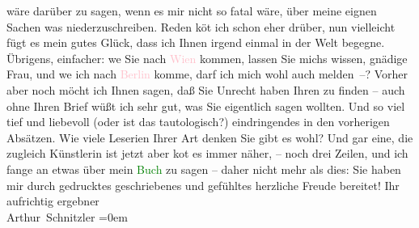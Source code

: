                wäre darüber zu sagen, wenn es mir nicht so fatal wäre, über meine eignen Sachen was
               niederzuschreiben. Reden kö{\geminationn}t ich schon eher drüber, nun
               vielleicht fügt es mein gutes Glück, dass {\pb}ich Ihnen irgend einmal in der Welt
               begegne. Übrigens, einfacher: we{\geminationn} Sie nach \textcolor{pink}{Wien}{}\ledrightnote{\textcolor{pink}{Wien}} kommen, lassen Sie michs wissen, gnädige Frau,
               und we{\geminationn} ich nach \textcolor{pink}{Berlin}{}\ledrightnote{\textcolor{pink}{Berlin}}
               komme, darf ich mich wohl auch melden –? Vorher aber noch möcht ich Ihnen sagen,
               daß Sie Unrecht haben Ihren \label{K_M178-11v}\label{K_M178-11h} zu finden – auch ohne Ihren Brief {\pb}wüßt ich sehr gut, was Sie eigentlich
               sagen wollten. Und so viel tief und liebevoll (oder ist das tautologisch?)
               eindringendes in den vorherigen Absätzen. Wie
               viele Leseri{\geminationn}en Ihrer Art denken Sie gibt es wohl? Und
               gar eine, die zugleich Künstlerin ist { }{\dotsfive} jetzt aber ko{\geminationm}t es immer
               näher, – noch drei Zeilen, und ich fange an etwas über mein {\pb}\textcolor{green}{Buch}{} zu sagen – daher nicht mehr als dies: Sie haben mir durch
               gedrucktes geschriebenes und gefühltes
               herzliche Freude bereitet!\pend
           \pstart
           Ihr aufrichtig ergebner{\\[\baselineskip]}\spacefill\mbox{Arthur Schnitzler}\pend
           \leftskip=0em{}\endnumbering{}  
      